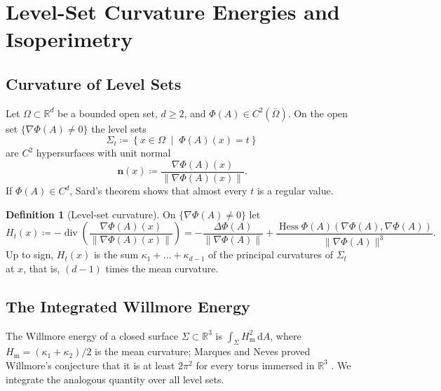 \documentclass[11pt,a4paper,reqno]{amsart}
\theoremstyle{definition}
\newtheorem{definition}[theorem]{Definition}
\numberwithin{equation}{section}
\newcommand{\R}{\mathbb{R}}
\newcommand{\dif}{\,\mathrm{d}}
\newcommand{\Hess}{\operatorname{Hess}}
\begin{document}
\section{Level-Set Curvature Energies and Isoperimetry}
\label{sec:willmore_gmt}

\subsection{Curvature of Level Sets}
Let $\Omega \subset \R^d$ be a bounded open set, $d \ge 2$, and $\Phi(A) \in C^2(\overline{\Omega})$. On the open set $\{\nabla \Phi(A) \ne 0\}$ the level sets
\begin{equation}
    \Sigma_t \coloneqq \left\{ x \in \Omega \;\middle|\; \Phi(A)(x) = t \right\}
\end{equation}
are $C^2$ hypersurfaces with unit normal
\begin{equation}
    \mathbf{n}(x) \coloneqq \frac{\nabla \Phi(A)(x)}{\|\nabla \Phi(A)(x)\|}.
\end{equation}
If $\Phi(A) \in C^d$, Sard's theorem \cite{sard1942measure} shows that almost every $t$ is a regular value.

\begin{definition}[Level-set curvature]
On $\{\nabla \Phi(A) \ne 0\}$ let
\begin{equation}
    H_t(x) \coloneqq -\operatorname{div}\left( \frac{\nabla \Phi(A)(x)}{\|\nabla \Phi(A)(x)\|} \right) = -\frac{\Delta \Phi(A)}{\|\nabla \Phi(A)\|} + \frac{\Hess \Phi(A)(\nabla \Phi(A), \nabla \Phi(A))}{\|\nabla \Phi(A)\|^3}.
\end{equation}
Up to sign, $H_t(x)$ is the sum $\kappa_1 + \dots + \kappa_{d-1}$ of the principal curvatures of $\Sigma_t$ at $x$, that is, $(d-1)$ times the mean curvature.
\end{definition}

\subsection{The Integrated Willmore Energy}
The Willmore energy of a closed surface $\Sigma \subset \R^3$ is $\int_\Sigma H_{\mathrm{m}}^2 \dif A$, where $H_{\mathrm{m}} = (\kappa_1 + \kappa_2)/2$ is the mean curvature; Marques and Neves proved Willmore's conjecture that it is at least $2\pi^2$ for every torus immersed in $\R^3$ \cite{marques2014minmax}. We integrate the analogous quantity over all level sets.
\end{document}
